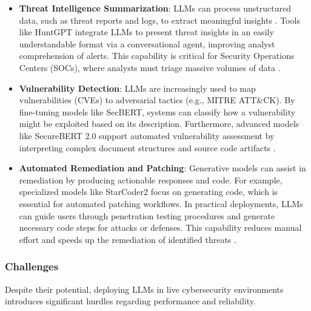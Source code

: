\begin{itemize}
    \item \textbf{Threat Intelligence Summarization}: LLMs can process unstructured data, such as threat reports and logs, to extract meaningful insights \cite{NLPFrameworks}. Tools like HuntGPT integrate LLMs to present threat insights in an easily understandable format via a conversational agent, improving analyst comprehension of alerts. This capability is critical for Security Operations Centers (SOCs), where analysts must triage massive volumes of data \cite{AnomalyExplainer}.
    \item \textbf{Vulnerability Detection}: LLMs are increasingly used to map vulnerabilities (CVEs) to adversarial tactics (e.g., MITRE ATT\&CK). By fine-tuning models like SecBERT, systems can classify how a vulnerability might be exploited based on its description. Furthermore, advanced models like SecureBERT 2.0 support automated vulnerability assessment by interpreting complex document structures and source code artifacts \cite{electronics14204094}.
    \item \textbf{Automated Remediation and Patching}: Generative models can assist in remediation by producing actionable responses and code. For example, specialized models like StarCoder2 focus on generating code, which is essential for automated patching workflows. In practical deployments, LLMs can guide users through penetration testing procedures and generate necessary code steps for attacks or defenses. This capability reduces manual effort and speeds up the remediation of identified threats \cite{AnomalyExplainer}.
\end{itemize}

\subsubsection{Challenges}
Despite their potential, deploying LLMs in live cybersecurity environments introduces significant hurdles regarding performance and reliability.

